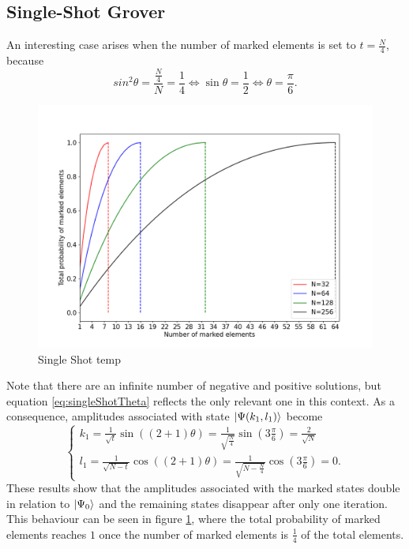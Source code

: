 \documentclass[../../dissertation.tex]{subfiles}
\begin{document}
\subsection{Single-Shot Grover}
An interesting case arises when the number of marked elements is set to $t=\frac{N}{4}$, because 
\begin{equation}
	sin^2\theta = \frac{\frac{N}{4}}{N} = \frac{1}{4} \iff \sin\theta = \frac{1}{2} \iff \theta = \frac{\pi}{6}. 
	\label{eq:singleShotTheta}
\end{equation}
\begin{figure}[h]
	\centering
	\includegraphics[scale=0.40]{img/Grover/GroverSingleShot3264128256}
	\caption{Single Shot temp} 
	\label{GroverSingleShot3264128256}
\end{figure}
Note that there are an infinite number of negative and positive solutions, but equation \ref{eq:singleShotTheta} reflects the only relevant one in this context. As a consequence, amplitudes associated with state $\ket{\Psi(k_1,l_1)}$ become 
\begin{equation}
	\begin{cases}
		k_{1} = \frac{1}{\sqrt{t}} \sin{((2+1)\theta)} = \frac{1}{\sqrt{\frac{N}{4}}} \sin{(3\frac{\pi}{6})} = \frac{2}{\sqrt{N}}
		\\l_{1} = \frac{1}{\sqrt{N-t}}\cos{((2+1)\theta)} = \frac{1}{\sqrt{N-\frac{N}{4}}}\cos{(3\frac{\pi}{6})} = 0.
	\end{cases}\label{eq:groverSingleShotKandJ}
\end{equation}
These results show that the amplitudes associated with the marked states double in relation to $\ket{\Psi_0}$ and the remaining states disappear after only one iteration. This behaviour can be seen in figure \ref{GroverSingleShot3264128256}, where the total probability of marked elements reaches $1$ once the number of marked elements is $\frac{1}{4}$ of the total elements.  
\end{document}
